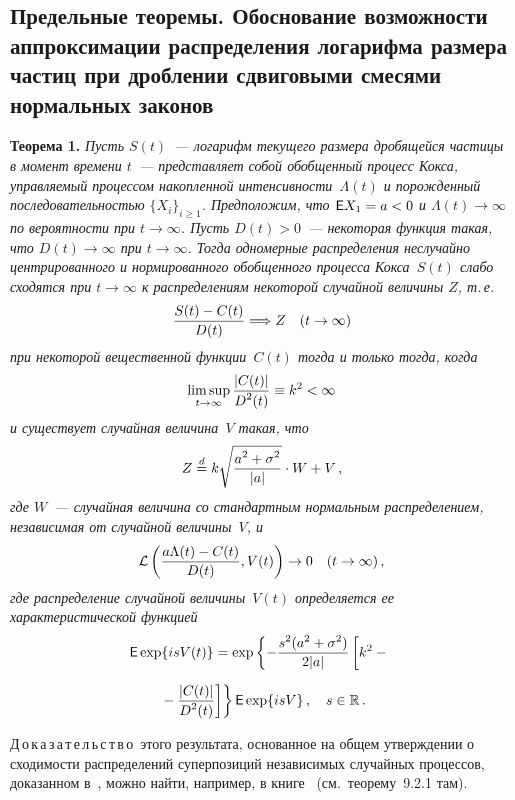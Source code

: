 \begin{multicols}{2}
\subsection{Предельные теоремы. Обоснование возможности аппроксимации
распределения логарифма размера частиц при дроблении сдвиговыми
смесями нормальных законов}

\noindent
\textbf{Теорема 1.} {\it Пусть $S(t)$~--- логарифм текущего размера
дробящейся частицы в момент времени $t$~--- пред\-став\-ля\-ет собой
обобщенный процесс Кокса, управляемый процессом накопленной
интенсивности~$\Lambda(t)$ и по\-рож\-ден\-ный последовательностью
$\{X_i\}_{i\ge1}$. Предположим, что ${\sf E}X_1=a<0$ и
$\Lambda(t)\longrightarrow\infty$ по вероятности при $t\to\infty$.
Пусть $D(t)>0$~--- некоторая функция такая, что $D(t)\to\infty$ при
$t\to\infty$. Тогда одномерные распределения неслучайно
центрированного и нормированного обобщенного процесса Кокса~$S(t)$ %
%
слабо сходятся при $t\to\infty$ к распределениям некоторой
случайной величины $Z$, т.\,е.
$$
\displaystyle\frac{\displaystyle S(t)-C(t)\mathstrut}{\displaystyle D(t)\mathstrut}\Longrightarrow Z\quad (t\to\infty)
$$
при некоторой вещественной функции~$C(t)$ тогда и только тогда,
когда
$$
\limsup_{t\to\infty}\displaystyle\frac{\displaystyle |C(t)|\mathstrut}{\displaystyle D^2(t)\mathstrut}\equiv k^2<\infty
$$
и существует случайная величина~$V$ такая, что
\begin{equation}
Z\stackrel{d}{=} k\sqrt{\displaystyle\frac{\displaystyle a^2+\sigma^2\mathstrut}{\displaystyle |a|\mathstrut}}\cdot W+V\,,
\label{e4kk}
\end{equation}
где $W$~--- случайная величина со стандартным нормальным
распределением, независимая от случайной величины~$V$, и
\begin{equation*}
\mathcal{L}\left(\displaystyle\frac{\displaystyle a\Lambda(t)-C(t)\mathstrut}{\displaystyle D(t)\mathstrut},V(t)\right)\to 0\quad
 (t\to\infty)\,,
\end{equation*}
где распределение случайной величины~$V(t)$ определяется ее
характеристической функцией
\begin{multline}
{\sf E}\exp\{isV(t)\}=\exp\left\{-\fr{s^2(a^2+\sigma^2)}{2|a|}
\left[
\vphantom{\fr{|C(t)|}{D^2(t)}}
k^2-\vphantom{\fr{|C(t)|}{D^2(t)}}\right.\right.\\[6pt]
\left.\left.{}-\fr{|C(t)|}{D^2(t)}\right]\right\}{\sf E}\exp\{isV\}\,,\quad
s\in\rR\,.
\label{e5kk}
\end{multline}
}
\smallskip

\noindent
Д\,о\,к\,а\,з\,а\,т\,е\,л\,ь\,с\,т\,в\,о\ этого результата, основанное на общем утверждении о
сходимости распределений суперпозиций независимых случайных
процессов, доказанном в~\cite{18kk}, можно найти, например, в книге~\cite{10kk}
(см.\ теорему~9.2.1 там).


\end{multicols}

